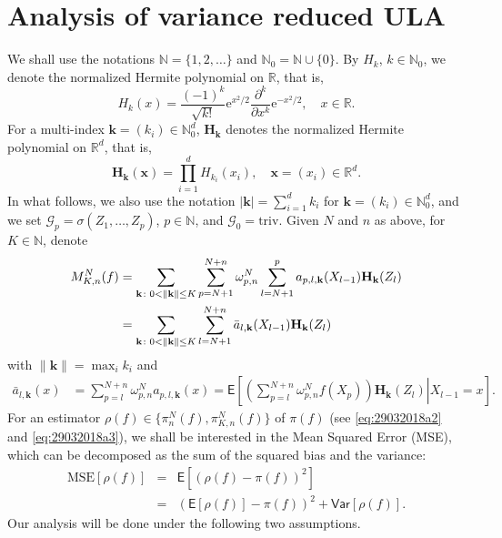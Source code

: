 \documentclass[bj]{imsart}
\def\rme{\mathrm{e}}
\begin{document}
\section{Analysis of variance reduced ULA}
\label{sec:ula_analysis}

We shall use the notations $\mathbb N=\{1,2,\ldots\}$ and $\mathbb N_0=\mathbb N\cup\{0\}$.
By $H_k$, $k\in\mathbb N_0$,
we denote the normalized Hermite polynomial on $\mathbb R$, that is,
$$
H_k(x)=\frac{(-1)^k}{\sqrt{k!}}\rme^{x^2/2}\frac{\partial^k}{\partial x^k}\rme^{-x^2/2},
\quad x\in\mathbb R.
$$
For a multi-index $\mathbf{k}=(k_i)\in\mathbb N_0^d$,
$\mathbf{H}_\mathbf{k}$ denotes the normalized Hermite polynomial on $\mathbb R^d$, that is,
$$
\mathbf{H}_\mathbf{k}(\mathbf{x})=\prod_{i=1}^d H_{k_i}(x_i),\quad \mathbf{x}=(x_i)\in\mathbb R^d.
$$
In what follows, we also use the notation
$|\mathbf{k}|=\sum_{i=1}^d k_i$ for $\mathbf{k}=(k_i)\in\mathbb N_0^d$,
and we set $\mathcal G_p=\sigma(Z_1,\ldots,Z_p)$, $p\in\mathbb N$, and $\mathcal G_0=\mathrm{triv}$.
Given $N$ and $n$ as above, for $K\in\mathbb N$, denote
\begin{align}
M_{K,n}^N(f) & =\sum_{\mathbf k\colon 0<\|\mathbf{k}\|\le K}\sum_{p=N+1}^{N+n}\omega_{p,n}^{N}\sum_{l=N+1}^{p}a_{p,l,\mathbf{k}}(X_{l-1})\mathbf{H}_\mathbf{k}(Z_{l})
\label{eq:29032018a5}\\
&=\sum_{\mathbf k\colon 0<\|\mathbf{k}\|\le K}\sum_{l=N+1}^{N+n}\bar{a}_{l,\mathbf{k}}(X_{l-1})\mathbf{H}_\mathbf{k}(Z_{l})
\notag
\end{align}
with \(\|\mathbf{k}\|=\max_{i} k_i\) and
\begin{align*}
\bar{a}_{l,\mathbf{k}}(x)
& =\sum_{p=l}^{N+n}\omega_{p,n}^{N}a_{p,l,\mathbf{k}}(x) =\mathsf{E}\left[\left.\left(\sum_{p=l}^{N+n}\omega_{p,n}^{N}f(X_{p})\right)\mathbf{H}_\mathbf{k}\left(Z_{l}\right)\right|X_{l-1}=x\right].
\end{align*}
For an estimator $\rho(f)\in\{\pi_n^N(f),\pi_{K,n}^N(f)\}$
of $\pi(f)$ (see \eqref{eq:29032018a2} and \eqref{eq:29032018a3}), we shall be interested in the Mean Squared Error (MSE),
which can be decomposed as the sum of the squared  bias
and the  variance:
\begin{eqnarray}\label{eq:29032018a4}
\mathrm{MSE}\left[\rho(f)\right]
&=&\mathsf{E}\left[(\rho(f)-\pi(f))^2\right]
\\
\nonumber
&=&\left(\mathsf{E}[\rho(f)]-\pi(f)\right)^2
+\mathsf{Var}[\rho(f)].
\end{eqnarray}
Our analysis will be done under the following two assumptions. 
\end{document}
